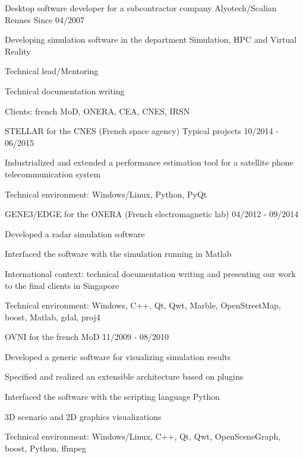 \begin{cventries}
  \cventry
    {Desktop software developer for a subcontractor company}
    {Alyotech/Scalian}
    {Rennes}
    {Since 04/2007}
    {
      \begin{cvitems}
        \item {Developing simulation software in the department Simulation, HPC
            and Virtual Reality}
        \item {Technical lead/Mentoring}
        \item {Technical documentation writing}
        \item {Clients: french MoD, ONERA, CEA, CNES, IRSN}
      \end{cvitems}
    }

  \cventry
    {STELLAR for the CNES (French space agency)}
    {Typical projects}
    {}
    {10/2014 - 06/2015}
    {
      \begin{cvitems}
        \item {Industrialized and extended a performance estimation tool for a
            satellite phone telecommunication system}
        \item {Technical environment: Windows/Linux, Python, PyQt}
      \end{cvitems}
    }

  \cventry
    {GENE3/EDGE for the ONERA (French electromagnetic lab)}
    {}
    {}
    {04/2012 - 09/2014}
    {
      \begin{cvitems}
        \item {Developed a radar simulation software}
        \item {Interfaced the software with the simulation running in Matlab}
        \item {International context: technical documentation writing and
            presenting our work to the final clients in Singapore}
		\item {Technical environment: Windows, C++, Qt, Qwt, Marble, OpenStreetMap,
	  		   boost, Matlab, gdal, proj4}
      \end{cvitems}
    }

  \cventry
    {OVNI for the french MoD}
    {}
    {}
    {11/2009 - 08/2010}
    {
      \begin{cvitems}
        \item {Developed a generic software for visualizing simulation results}
        \item {Specified and realized an extensible architecture based on plugins}
        \item {Interfaced the software with the scripting language Python}
        \item {3D scenario and 2D graphics visualizations}
		\item {Technical environment: Windows/Linux, C++, Qt, Qwt, OpenSceneGraph,
			boost, Python, ffmpeg}
      \end{cvitems}
    }


\end{cventries}
